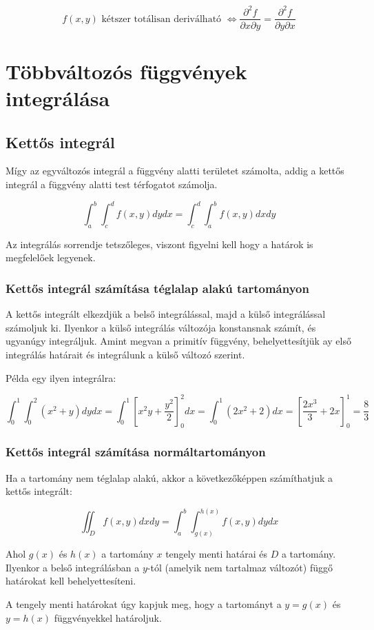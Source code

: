 \documentclass{article}
\begin{document}
\begin{equation*}
    f(x,y) \text{ kétszer totálisan deriválható } \Leftrightarrow \frac{\partial^2 f}{\partial x \partial y} = \frac{\partial^2 f}{\partial y \partial x}
\end{equation*}


\newpage

\section{Többváltozós függvények integrálása}

\subsection{Kettős integrál}

Mígy az egyváltozós integrál a függvény alatti területet számolta, addig a kettős integrál a függvény alatti test térfogatot számolja.

\begin{equation*}
    \int_{a}^{b} \int_{c}^{d} f(x,y) dy dx = \int_{c}^{d} \int_{a}^{b} f(x,y) dx dy
\end{equation*}

Az integrálás sorrendje tetszőleges, viszont figyelni kell hogy a határok is megfelelőek legyenek.

\subsubsection{Kettős integrál számítása téglalap alakú tartományon}

A kettős integrált elkezdjük a belső integrálással, majd a kül\-ső in\-teg\-rá\-lás\-sal számoljuk ki.
Ilyenkor a külső integrálás változója konstansnak számít, és ugyanúgy integráljuk. Amint megvan a primitív függvény, behelyettesítjük ay első integrálás határait
és integrálunk a külső változó szerint.

Példa egy ilyen integrálra:

\begin{equation*}
    \int_{0}^{1} \int_{0}^{2} (x^2 + y) dy dx = \int_{0}^{1} \left[ x^2y + \frac{y^2}{2} \right]_{0}^{2} dx = \int_{0}^{1} (2x^2 + 2) dx = \left[ \frac{2x^3}{3} + 2x \right]_{0}^{1} = \frac{8}{3}
\end{equation*}

\subsubsection{Kettős integrál számítása normáltartományon}

Ha a tartomány nem téglalap alakú, akkor a következőképpen számíthatjuk a kettős integrált:

\begin{equation*}
    \iint_{D} f(x,y) dx dy = \int_{a}^{b} \int_{g(x)}^{h(x)} f(x,y) dy dx
\end{equation*}

Ahol $g(x)$ és $h(x)$ a tartomány $x$ tengely menti határai és $D$ a tartomány. Ilyenkor a belső integrálásban a $y$-tól (amelyik nem tartalmaz változót) függő határokat kell behelyettesíteni.

A tengely menti határokat úgy kapjuk meg, hogy a tartományt a $y = g(x)$ és $y = h(x)$ függvényekkel határoljuk.
\end{document}
